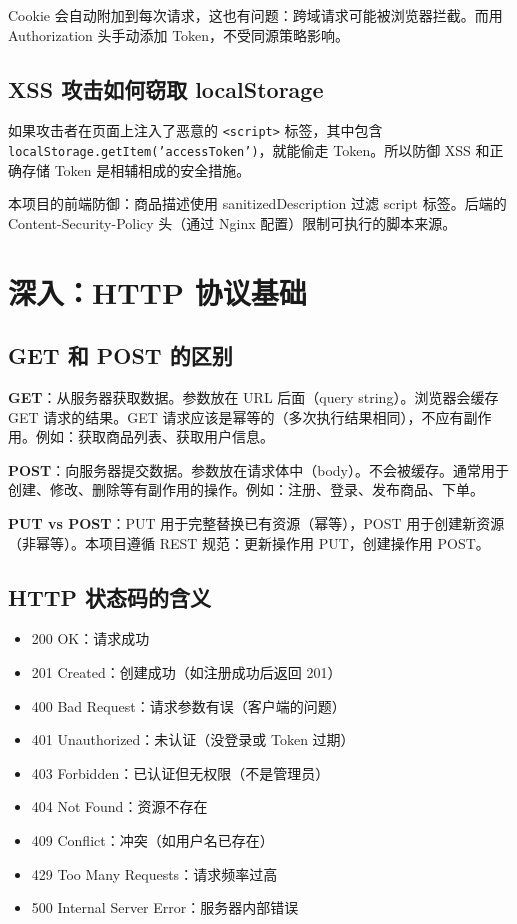 \documentclass[12pt,a4paper]{ctexart}
\begin{document}
Cookie 会自动附加到每次请求，这也有问题：跨域请求可能被浏览器拦截。而用 Authorization 头手动添加 Token，不受同源策略影响。

\subsection{XSS 攻击如何窃取 localStorage}

如果攻击者在页面上注入了恶意的 \texttt{<script>} 标签，其中包含 \texttt{localStorage.getItem('accessToken')}，就能偷走 Token。所以防御 XSS 和正确存储 Token 是相辅相成的安全措施。

本项目的前端防御：商品描述使用 sanitizedDescription 过滤 script 标签。后端的 Content-Security-Policy 头（通过 Nginx 配置）限制可执行的脚本来源。

\section{深入：HTTP 协议基础}

\subsection{GET 和 POST 的区别}

\textbf{GET}：从服务器获取数据。参数放在 URL 后面（query string）。浏览器会缓存 GET 请求的结果。GET 请求应该是幂等的（多次执行结果相同），不应有副作用。例如：获取商品列表、获取用户信息。

\textbf{POST}：向服务器提交数据。参数放在请求体中（body）。不会被缓存。通常用于创建、修改、删除等有副作用的操作。例如：注册、登录、发布商品、下单。

\textbf{PUT vs POST}：PUT 用于完整替换已有资源（幂等），POST 用于创建新资源（非幂等）。本项目遵循 REST 规范：更新操作用 PUT，创建操作用 POST。

\subsection{HTTP 状态码的含义}

\begin{itemize}
  \item 200 OK：请求成功
  \item 201 Created：创建成功（如注册成功后返回 201）
  \item 400 Bad Request：请求参数有误（客户端的问题）
  \item 401 Unauthorized：未认证（没登录或 Token 过期）
  \item 403 Forbidden：已认证但无权限（不是管理员）
  \item 404 Not Found：资源不存在
  \item 409 Conflict：冲突（如用户名已存在）
  \item 429 Too Many Requests：请求频率过高
  \item 500 Internal Server Error：服务器内部错误
\end{itemize}
\end{document}
